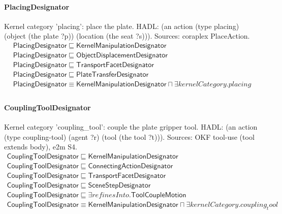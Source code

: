 \documentclass[10pt]{article}
\begin{document}
\paragraph{PlacingDesignator} Kernel category 'placing': place the plate. HADL: (an action (type placing) (object (the plate ?p)) (location (the seat ?s))). Sources: coraplex PlaceAction.
\[\begin{array}{l}
\mathsf{PlacingDesignator} \sqsubseteq  \mathsf{KernelManipulationDesignator} \\
\mathsf{PlacingDesignator} \sqsubseteq  \mathsf{ObjectDisplacementDesignator} \\
\mathsf{PlacingDesignator} \sqsubseteq  \mathsf{TransportFacetDesignator} \\
\mathsf{PlacingDesignator} \sqsubseteq  \mathsf{PlateTransferDesignator} \\
\mathsf{PlacingDesignator} \equiv  \mathsf{KernelManipulationDesignator} \sqcap  \exists \mathit{kernelCategory}.{placing} \\
\end{array}\]
\paragraph{CouplingToolDesignator} Kernel category 'coupling\_tool': couple the plate gripper tool. HADL: (an action (type coupling-tool) (agent ?r) (tool (the tool ?t))). Sources: OKF tool-use (tool extends body), e2m S4.
\[\begin{array}{l}
\mathsf{CouplingToolDesignator} \sqsubseteq  \mathsf{KernelManipulationDesignator} \\
\mathsf{CouplingToolDesignator} \sqsubseteq  \mathsf{ConnectingActionDesignator} \\
\mathsf{CouplingToolDesignator} \sqsubseteq  \mathsf{TransportFacetDesignator} \\
\mathsf{CouplingToolDesignator} \sqsubseteq  \mathsf{SceneStepDesignator} \\
\mathsf{CouplingToolDesignator} \sqsubseteq  \exists \mathit{refinesInto}.\mathsf{ToolCoupleMotion} \\
\mathsf{CouplingToolDesignator} \equiv  \mathsf{KernelManipulationDesignator} \sqcap  \exists \mathit{kernelCategory}.{coupling_tool} \\
\end{array}\]
\end{document}
